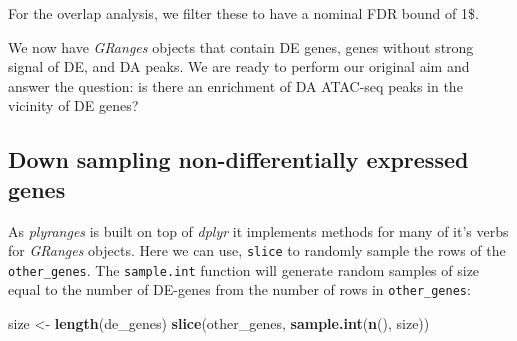 \documentclass[
  9pt,
  a4paper,
]{extarticle}
\newenvironment{Shaded}{\begin{snugshade}}{\end{snugshade}}
\newcommand{\FloatTok}[1]{\textcolor[rgb]{0.00,0.00,0.81}{#1}}
\newcommand{\KeywordTok}[1]{\textcolor[rgb]{0.13,0.29,0.53}{\textbf{#1}}}
\newcommand{\NormalTok}[1]{#1}
\newcommand{\OperatorTok}[1]{\textcolor[rgb]{0.81,0.36,0.00}{\textbf{#1}}}
\newcommand{\StringTok}[1]{\textcolor[rgb]{0.31,0.60,0.02}{#1}}
\begin{document}
For the overlap analysis, we filter these to have a nominal FDR bound of 1\$.

\begin{Shaded}
\end{Shaded}

We now have \emph{GRanges} objects that contain DE genes, genes without strong
signal of DE, and DA peaks. We are ready to perform our original aim and answer
the question: is there an enrichment of DA ATAC-seq peaks in the vicinity of DE
genes?

\hypertarget{down-sampling-non-differentially-expressed-genes}{%
\subsection{Down sampling non-differentially expressed genes}\label{down-sampling-non-differentially-expressed-genes}}

As \emph{plyranges} is built on top of \emph{dplyr} it implements methods for many of
it's verbs for \emph{GRanges} objects. Here we can use, \texttt{slice} to randomly sample
the rows of the \texttt{other\_genes}. The \texttt{sample.int} function will generate random
samples of size equal to the number of DE-genes from the number of rows in
\texttt{other\_genes}:

\begin{Shaded}
\begin{Highlighting}[]
\NormalTok{size <-}\StringTok{ }\KeywordTok{length}\NormalTok{(de_genes)}
\KeywordTok{slice}\NormalTok{(other_genes, }\KeywordTok{sample.int}\NormalTok{(}\KeywordTok{n}\NormalTok{(), size))}
\end{Highlighting}
\end{Shaded}
\end{document}
